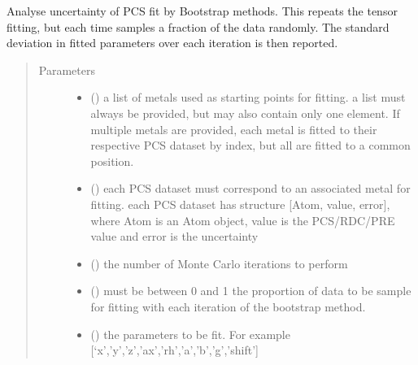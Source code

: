 \documentclass[a4paper,10pt,english,openany,oneside]{sphinxmanual}
\begin{document}
\begin{fulllineitems}
\label{\detokenize{reference/generated/paramagpy.fit.pcs_fit_error_bootstrap:paramagpy.fit.pcs_fit_error_bootstrap}}
Analyse uncertainty of PCS fit by Bootstrap methods.
This repeats the tensor fitting, but each time samples a fraction
of the data randomly. The standard deviation in fitted parameters
over each iteration is then reported.
\begin{quote}\begin{description}
\item[{Parameters}] \leavevmode\begin{itemize}
\item {} 
 () \textendash{} a list of metals used as starting points for fitting.
a list must always be provided, but may also contain
only one element. If multiple metals are provided, each metal
is fitted to their respective PCS dataset by index, but all are
fitted to a common position.

\item {} 
 () \textendash{} each PCS dataset must correspond to an associated metal for fitting.
each PCS dataset has structure {[}Atom, value, error{]}, where Atom is
an Atom object, value is the PCS/RDC/PRE value
and error is the uncertainty

\item {} 
 () \textendash{} the number of Monte Carlo iterations to perform

\item {} 
 () \textendash{} must be between 0 and 1
the proportion of data to be sample for fitting with each iteration
of the bootstrap method.

\item {} 
 () \textendash{} the parameters to be fit.
For example {[}‘x’,’y’,’z’,’ax’,’rh’,’a’,’b’,’g’,’shift’{]}


\end{itemize}
\end{description}
\end{quote}
\end{fulllineitems}
\end{document}
